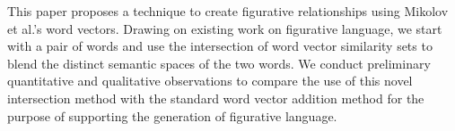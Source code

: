 This paper proposes a technique to create figurative  relationships  using Mikolov  et  al.'s word vectors.  Drawing on existing work on figurative language,  we  start  with  a  pair  of words and use the intersection of word vector similarity  sets  to  blend  the  distinct  semantic spaces of the two words. We conduct preliminary quantitative and qualitative observations to compare the use of this novel intersection method with the standard word vector addition method for the purpose of supporting the generation of figurative language.
